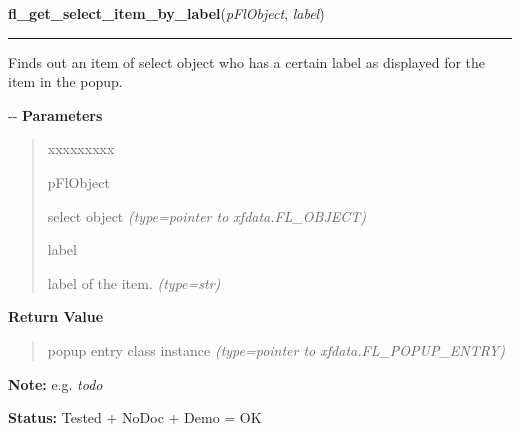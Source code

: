 \hspace{.8\funcindent}\begin{boxedminipage}{\funcwidth}

    \raggedright \textbf{fl\_get\_select\_item\_by\_label}(\textit{pFlObject}, \textit{label})

    \vspace{-1.5ex}

    \rule{\textwidth}{0.5\fboxrule}
\setlength{\parskip}{2ex}

Finds out an item of select object who has a certain label as
displayed for the item in the popup.

-{}-
\setlength{\parskip}{1ex}
      \textbf{Parameters}
      \vspace{-1ex}

      \begin{quote}
        \begin{Ventry}{xxxxxxxxx}

          \item[pFlObject]


select object
            {\it (type=pointer to xfdata.FL\_OBJECT)}

          \item[label]


label of the item.
            {\it (type=str)}

        \end{Ventry}

      \end{quote}

      \textbf{Return Value}
    \vspace{-1ex}

      \begin{quote}

popup entry class instance
      {\it (type=pointer to xfdata.FL\_POPUP\_ENTRY)}

      \end{quote}

\textbf{Note:} 
e.g. \emph{todo}


\textbf{Status:} 
Tested + NoDoc + Demo = OK


    \end{boxedminipage}

    \label{xformslib:flselect:fl_get_select_item_by_text}

    \vspace{0.5ex}

